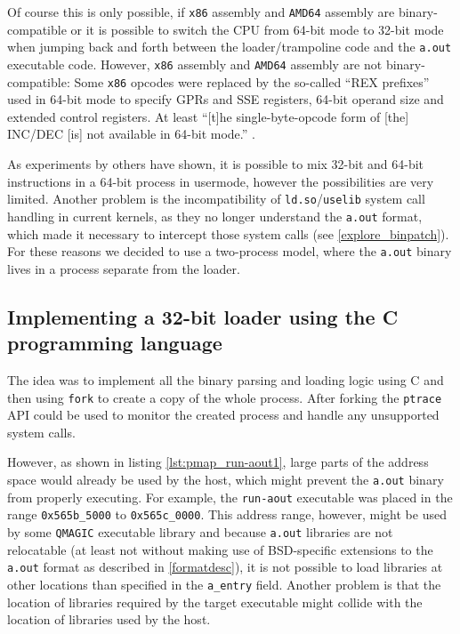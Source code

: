 \documentclass[draft,final]{vutinfth} %
\begin{document}
Of course this is only possible, if \texttt{x86} assembly and \texttt{AMD64} assembly are binary-compatible or it is possible to switch the CPU from 64-bit mode to 32-bit mode when jumping back and forth between the loader/trampoline code and the \texttt{a.out} executable code. However, \texttt{x86} assembly and \texttt{AMD64} assembly are not binary-compatible: Some \texttt{x86} opcodes were replaced by the so-called ``REX prefixes'' used in 64-bit mode to specify GPRs and SSE registers, 64-bit operand size and extended control registers\cite[2.2.1]{IntelManualVol2A}.  At least ``[t]he single-byte-opcode form of [the] INC/DEC [is] not available in 64-bit mode.'' \cite[2.2.1.2, par. 2]{IntelManualVol2A}.

As experiments by others have shown\cite{SOMix32And64BitInstructions}, it is possible to mix 32-bit and 64-bit instructions in a 64-bit process in usermode, however the possibilities are very limited. Another problem is the incompatibility of \texttt{ld.so}/\texttt{uselib} system call handling in current kernels, as they no longer understand the \texttt{a.out} format, which made it necessary to intercept those system calls (see \ref{explore_binpatch}). For these reasons we decided to use a two-process model, where the \texttt{a.out} binary lives in a process separate from the loader.

\subsection{Implementing a 32-bit loader using the C programming language}
\label{explore_loader_using_C}

The idea was to implement all the binary parsing and loading logic using C and then using \texttt{fork} to create a copy of the whole process. After forking the \texttt{ptrace} API could be used to monitor the created process and handle any unsupported system calls.

However, as shown in listing \ref{lst:pmap_run-aout1}, large parts of the address space would already be used by the host, which might prevent the \texttt{a.out} binary from properly executing. For example, the \texttt{run-aout} executable was placed in the range \texttt{0x565b\_5000} to \texttt{0x565c\_0000}. This address range, however, might be used by some \texttt{QMAGIC} executable library and because \texttt{a.out} libraries are not relocatable (at least not without making use of BSD-specific extensions to the \texttt{a.out} format as described in \ref{formatdesc}), it is not possible to load libraries at other locations than specified in the \texttt{a\_entry} field. Another problem is that the location of libraries required by the target executable might collide with the location of libraries used by the host.
\end{document}
